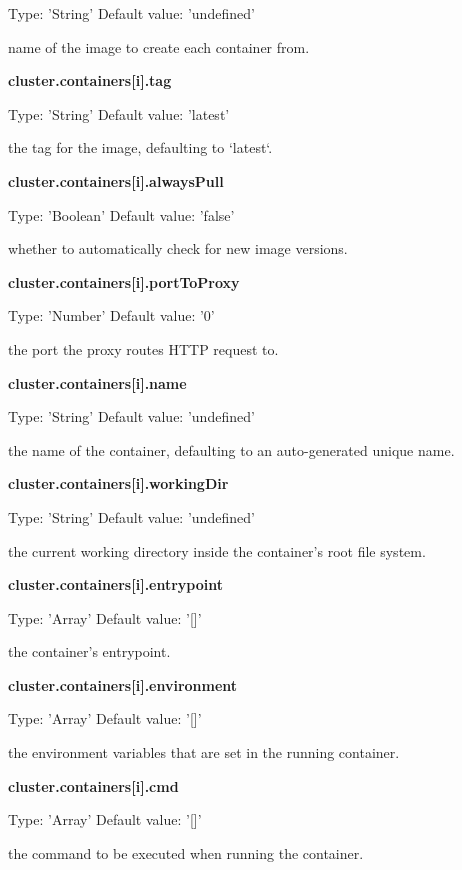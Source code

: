 \documentclass[a4paper,11pt,twoside]{report}
\begin{document}
\noindent
Type: 'String' Default value: 'undefined'\smallskip

\noindent 
name of the image to create each container from.\bigskip

\noindent
\textbf{cluster.containers[i].tag}

\noindent
Type: 'String' Default value: 'latest'\smallskip

\noindent 
the tag for the image, defaulting to `latest`.\bigskip

\noindent
\textbf{cluster.containers[i].alwaysPull}

\noindent
Type: 'Boolean' Default value: 'false'\smallskip

\noindent 
whether to automatically check for new image versions.\bigskip

\noindent
\textbf{cluster.containers[i].portToProxy}

\noindent
Type: 'Number' Default value: '0'\smallskip

\noindent 
the port the proxy routes HTTP request to.\bigskip

\noindent
\textbf{cluster.containers[i].name}

\noindent
Type: 'String' Default value: 'undefined'\smallskip

\noindent 
the name of the container, defaulting to an auto-generated unique name.\bigskip

\noindent
\textbf{cluster.containers[i].workingDir}

\noindent
Type: 'String' Default value: 'undefined'\smallskip

\noindent 
the current working directory inside the container's root file system.\bigskip

\noindent
\textbf{cluster.containers[i].entrypoint}

\noindent
Type: 'Array' Default value: '[]'\smallskip

\noindent 
the container's entrypoint.\bigskip

\noindent
\textbf{cluster.containers[i].environment}

\noindent
Type: 'Array' Default value: '[]'\smallskip

\noindent 
the environment variables that are set in the running container.\bigskip

\noindent
\textbf{cluster.containers[i].cmd}

\noindent
Type: 'Array' Default value: '[]'\smallskip

\noindent 
the command to be executed when running the container.\bigskip
\end{document}
